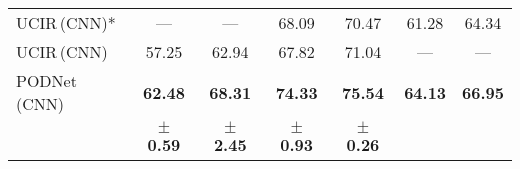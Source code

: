 \begin{table*}[t]
\begin{tabular}{@{}l|cccc|cc@{}}
        UCIR\,{\scriptsize (CNN)}* \cite{hou2019ucir} & ---                              & ---                              & 68.09                            & 70.47                            & 61.28          & 64.34          \\
        UCIR\,{\scriptsize (CNN)} \cite{hou2019ucir}  & 57.25                            & 62.94                            & 67.82                            & 71.04                            & ---            & ---            \\
        PODNet\,{\scriptsize (CNN)}                   & \textbf{62.48}                   & \textbf{68.31}                   & \textbf{74.33}                   & \textbf{75.54}                   & \textbf{64.13} & \textbf{66.95} \\

                                                      & \scriptsize{\textbf{$\pm$ 0.59}} & \scriptsize{\textbf{$\pm$ 2.45}} & \scriptsize{\textbf{$\pm$ 0.93}} & \scriptsize{\textbf{$\pm$ 0.26}} &                &                \\

        \bottomrule
    \end{tabular}
\end{table*}

